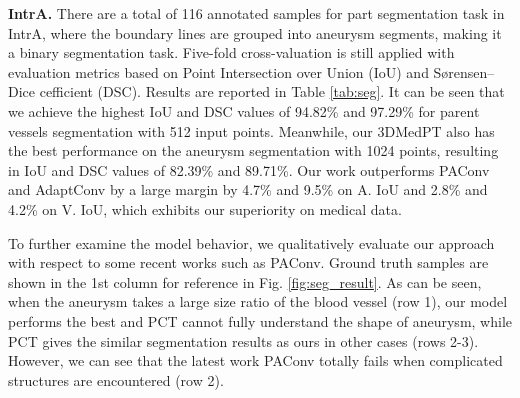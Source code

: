 \documentclass[10pt,twocolumn,letterpaper]{article}
\begin{document}
\noindent \textbf{IntrA.}
There are a total of 116 annotated samples for part segmentation task in IntrA, where the boundary lines are grouped into aneurysm segments, making it a binary segmentation task.
Five-fold cross-valuation is still applied with evaluation metrics based on Point Intersection over Union (IoU) and Sørensen–Dice cefficient (DSC).
Results are reported in Table \ref{tab:seg}.
It can be seen that we achieve the highest IoU and DSC values of 94.82\% and 97.29\% for parent vessels segmentation with 512 input points.
Meanwhile, our 3DMedPT also has the best performance on the aneurysm segmentation with 1024 points, resulting in IoU and DSC values of 82.39\% and 89.71\%.
Our work outperforms PAConv and AdaptConv by a large margin by 4.7\% and 9.5\% on A. IoU and 2.8\% and 4.2\% on V. IoU, which exhibits our superiority on medical data.



To further examine the model behavior, we qualitatively evaluate our approach with respect to some recent works such as PAConv.
Ground truth samples are shown in the 1st column for reference in Fig. \ref{fig:seg_result}.
As can be seen, when the aneurysm takes a large size ratio of the blood vessel (row 1), our model performs the best and PCT cannot fully understand the shape of aneurysm, while PCT gives the similar segmentation results as ours in other cases (rows 2-3).
However, we can see that the latest work PAConv totally fails when complicated structures are encountered (row 2).
\end{document}
